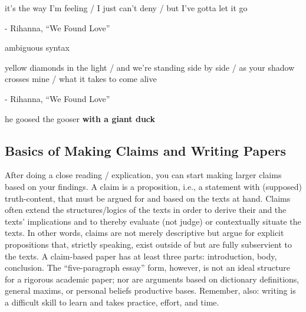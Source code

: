 \documentclass[12pt]{article}
\begin{document}
\begin{exe}
\begin{xlist}
    \ex it's the way I'm feeling / I just can't deny / but I've gotta let it go \par \hfill - Rihanna, ``We Found Love'' \par [if not proleptic, ``deny'' expects an object, but the sentence instead switches to a new independent clause]
    \end{xlist}
\ex ambiguous syntax
    \begin{xlist}
    \ex yellow diamonds in the light / and we're standing side by side / as your shadow crosses mine / what it takes to come alive \par \hfill - Rihanna, ``We Found Love'' \par [it's not clear how these clauses should be combined]
    \ex he goosed the gooser \textbf{with a giant duck} \par [it's unclear whether ``a giant duck'' is the means by which the agent (i.e., ``he'') ``goosed'', is an active helper of the agent, or is a particular property of the object (i.e., ``the gooser'')]
    \end{xlist}
\end{exe}
\subsection{Basics of Making Claims and Writing Papers}

After doing a close reading / explication, you can start making larger claims based on your findings. A claim is a proposition, i.e., a statement with (supposed) truth-content, that must be argued for and based on the texts at hand. Claims often extend the structures/logics of the texts in order to derive their and the texts’ implications and to thereby evaluate (not judge) or contextually situate the texts. In other words, claims are not merely descriptive but argue for explicit propositions that, strictly speaking, exist outside of but are fully subservient to the texts. A claim-based paper has at least three parts: introduction, body, conclusion. The “five-paragraph essay” form, however, is not an ideal structure for a rigorous academic paper; nor are arguments based on dictionary definitions, general maxims, or personal beliefs productive bases. Remember, also: writing is a difficult skill to learn and takes practice, effort, and time.
\end{document}
